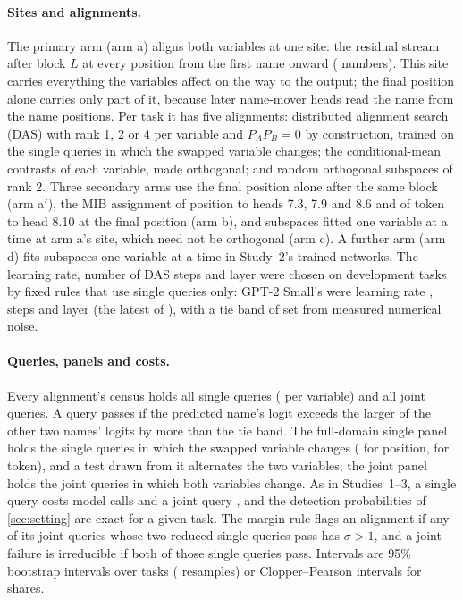 \paragraph{Sites and alignments.} The primary arm (arm a) aligns both variables at one site: the residual stream
after block $L$ at every position from the first name onward (\SiteDim{} numbers). This site carries everything the
variables affect on the way to the output; the final position alone carries only part of it, because later
name-mover heads read the name from the name positions. Per task it has five alignments: distributed alignment search
(DAS) with rank 1, 2 or 4 per variable and $P_AP_B=0$ by construction, trained on the single queries in which the
swapped variable changes; the conditional-mean contrasts of each variable, made orthogonal; and random orthogonal
subspaces of rank 2. Three secondary arms use the final position alone after the same block (arm a$'$), the MIB
assignment of position to heads 7.3, 7.9 and 8.6 and of token to head 8.10 at the final position (arm b), and
subspaces fitted one variable at a time at arm a's site, which need not be orthogonal (arm c). A further arm (arm d)
fits subspaces one variable at a time in Study~2's \TrnNetworks{} trained networks. The learning rate, number of DAS
steps and layer were chosen on development tasks by fixed rules that use single queries only: GPT-2 Small's were
learning rate \LrSmall, \StepsSmall{} steps and layer \LayerSmall{} (the latest of \CandSmall), with a tie band of
\TieBand{} set from measured numerical noise.

\paragraph{Queries, panels and costs.} Every alignment's census holds all \NSingle{} single queries (\NSinglePerVar{}
per variable) and all \NJoint{} joint queries. A query passes if the predicted name's logit exceeds the larger of the
other two names' logits by more than the tie band. The full-domain single panel holds the single queries in which the
swapped variable changes (\NFullA{} for position, \NFullB{} for token), and a test drawn from it alternates the two
variables; the joint panel holds the \NJointPanel{} joint queries in which both variables change. As in Studies~1--3,
a single query costs \CostSingle{} model calls and a joint query \CostJoint, and the detection probabilities of
\cref{sec:setting} are exact for a given task. The margin rule flags an alignment if any of its joint queries whose two
reduced single queries pass has $\sigma>1$, and a joint failure is irreducible if both of those single queries pass.
Intervals are 95\% bootstrap intervals over tasks (\NBoot{} resamples) or Clopper--Pearson intervals for shares.

